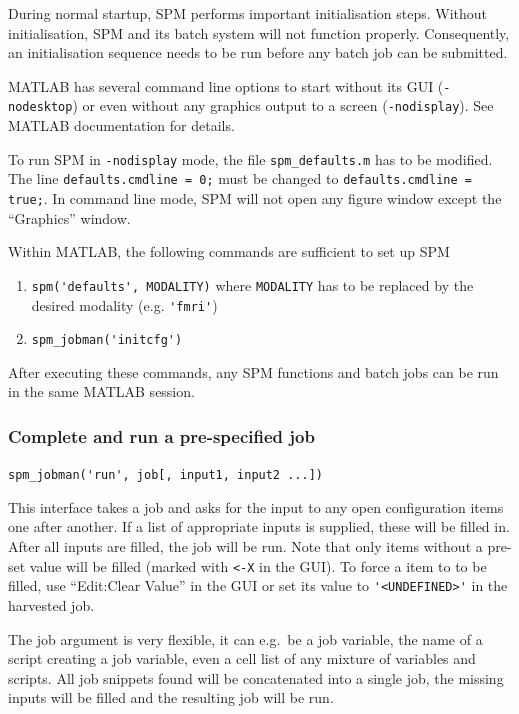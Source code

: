 During normal startup, SPM performs important initialisation
steps. Without initialisation, SPM and its batch system will not
function properly. Consequently, an initialisation sequence needs to
be run before any batch job can be submitted.

MATLAB has several command line options to start without its GUI
(\verb|-nodesktop|) or even without any graphics output to a screen
(\verb|-nodisplay|). See MATLAB documentation for details.

To run SPM in \verb|-nodisplay| mode, the file \verb|spm_defaults.m|
has to be modified. The line \verb|defaults.cmdline = 0;| must be
changed to \verb|defaults.cmdline = true;|. In command line mode, SPM
will not open any figure window except the ``Graphics'' window. 

Within MATLAB, the following commands are sufficient to set up SPM
\begin{enumerate}
\item \verb|spm('defaults', MODALITY)| where \verb|MODALITY| has to be
  replaced by the desired modality (e.g. \verb|'fmri'|)
\item \verb|spm_jobman('initcfg')|
\end{enumerate}
After executing these commands, any SPM functions and batch jobs
can be run in the same MATLAB session.

\subsubsection{Complete and run a pre-specified job}
\label{sec:batch_interface_cmd_cfg_serial}

\verb|spm_jobman('run', job[, input1, input2 ...])|

This interface takes a job and asks for the input to any open configuration
items one after another. If a list of appropriate inputs is supplied, these
will be filled in. After all inputs are filled, the job will be run. Note that
only items without a pre-set value will be filled (marked with \verb|<-X| in
the GUI). To force a item to to be filled, use ``Edit:Clear Value''
in the GUI or set its value to \verb|'<UNDEFINED>'| in the harvested job.

The job argument is very flexible, it can e.g.\ be a job variable, the
name of a script creating a job variable, even a cell list of any
mixture of variables and scripts. All job snippets found will be
concatenated into a single job, the missing inputs will be filled and
the resulting job will be run.

